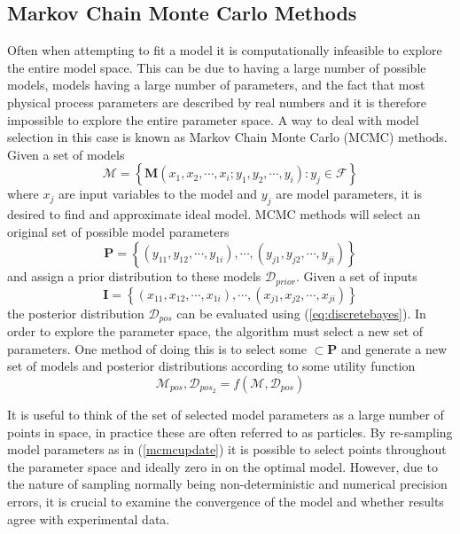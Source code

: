 \subsection{Markov Chain Monte Carlo Methods}
\label{sec:mcmcupdate}
Often when attempting to fit a model it is computationally infeasible to explore the entire model space. This can be due to having a large number of possible models, models having a large number of parameters, and the fact that most physical process parameters are described by real numbers and it is therefore impossible to explore the entire parameter space. A way to deal with model selection in this case is known as Markov Chain Monte Carlo (MCMC) methods. Given a set of models 
\begin{equation}
\mathcal{M} = \left\{\mathbf{M}(x_1,x_2,\cdots,x_i;y_1,y_2,\cdots,y_i) : y_j \in \mathcal{F}\right\}
\label{eq:models}
\end{equation}
where $x_j$ are input variables to the model and $y_j$ are model parameters, it is desired to find and approximate ideal model. MCMC methods will select an original set of possible model parameters $$\mathbf{P} = \left\{(y_{11},y_{12},\cdots,y_{1i}),\cdots,(y_{j1},y_{j2},\cdots,y_{ji})\right\}$$ and assign a prior distribution to these models $\mathcal{D}_{prior}$. Given a set of inputs $$\mathbf{I} = \left\{(x_{11},x_{12},\cdots,x_{1i}),\cdots,(x_{j1},x_{j2},\cdots,x_{ji})\right\}$$ the posterior distribution $\mathcal{D}_{pos}$ can be evaluated using (\ref{eq:discretebayes}). In order to explore the parameter space, the algorithm must select a new set of parameters. One method of doing this is to select some $\subset \mathbf{P}$ and generate a new set of models and posterior distributions according to some utility function\cite{bayes}
\begin{equation}
\mathcal{M}_{pos},\mathcal{D}_{pos_2} = f(\mathcal{M},\mathcal{D}_{pos})
\label{mcmcupdate} 
\end{equation}

It is useful to think of the set of selected model parameters as a large number of points in space, in practice these are often referred to as particles. By re-sampling model parameters as in (\ref{mcmcupdate}) it is possible to select points throughout the parameter space and ideally zero in on the optimal model. However, due to the nature of sampling normally being non-deterministic and numerical precision errors, it is crucial to examine the convergence of the model and whether results agree with experimental data. 

